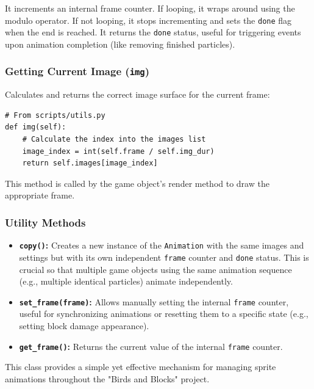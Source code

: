 \documentclass[11pt, a4paper]{article}
\begin{document}
It increments an internal frame counter. If looping, it wraps around using the modulo operator. If not looping, it stops incrementing and sets the \texttt{done} flag when the end is reached. It returns the \texttt{done} status, useful for triggering events upon animation completion (like removing finished particles).

\subsubsection{Getting Current Image (\texttt{img})}

Calculates and returns the correct image surface for the current frame:

\begin{lstlisting}[caption={Animation.img() Method}, label={lst:animation_img}]
# From scripts/utils.py
def img(self):
    # Calculate the index into the images list
    image_index = int(self.frame / self.img_dur)
    return self.images[image_index]
\end{lstlisting}

This method is called by the game object's render method to draw the appropriate frame.

\subsubsection{Utility Methods}

\begin{itemize}

    \item \textbf{\texttt{copy()}:} Creates a new instance of the \texttt{Animation} with the same images and settings but with its own independent \texttt{frame} counter and \texttt{done} status. This is crucial so that multiple game objects using the same animation sequence (e.g., multiple identical particles) animate independently.
    
    \item \textbf{\texttt{set\_frame(frame)}:} Allows manually setting the internal \texttt{frame} counter, useful for synchronizing animations or resetting them to a specific state (e.g., setting block damage appearance).
    
    \item \textbf{\texttt{get\_frame()}:} Returns the current value of the internal \texttt{frame} counter.

\end{itemize}

This class provides a simple yet effective mechanism for managing sprite animations throughout the "Birds and Blocks" project.
\end{document}

